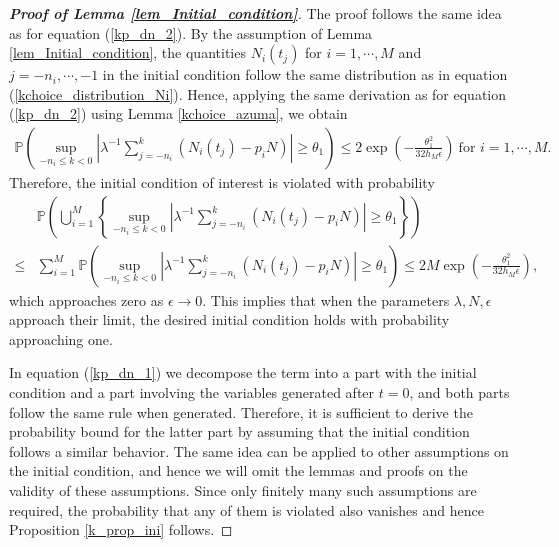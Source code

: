 \documentclass[12pt]{article}
\def\P{\mathbb{P}}
\numberwithin{equation}{section}  %
\begin{document}
\begin{proof}[\textbf{Proof of Lemma \ref{lem_Initial_condition}}]
The proof follows the same idea as for equation (\ref{kp_dn_2}). By the assumption of Lemma \ref{lem_Initial_condition}, the quantities $N_i(t_j)$ for $i=1,\cdots,M$ and $j=-n_i,\cdots,-1$ in the initial condition follow the same distribution as in equation (\ref{kchoice_distribution_Ni}). Hence, applying the same derivation as for equation (\ref{kp_dn_2}) using Lemma \ref{kchoice_azuma}, we obtain
\begin{align*}
\P\left(\sup_{-n_i\leq k<0}\left|\lambda^{-1}\sum_{j=-n_i}^{k} \left(N_i(t_j)-p_iN\right)\right| \geq \theta_1 
\right) \leq 2\exp\left(-\frac{\theta_1^2}{32h_M\epsilon}\right)\ \text{for }i=1,\cdots,M.
\end{align*}
Therefore, the initial condition of interest is violated with probability
\begin{align*}
&\P\left(\bigcup_{i=1}^{M}\left\{\sup_{-n_i\leq k<0}\left|\lambda^{-1}\sum_{j=-n_i}^{k} \left(N_i(t_j)-p_iN\right)\right|\geq\theta_1\right\}\right)\\
    \leq&\sum_{i=1}^M\P\left(\sup_{-n_i\leq k<0}\left|\lambda^{-1}\sum_{j=-n_i}^{k} \left(N_i(t_j)-p_iN\right)\right| \geq \theta_1 
\right) \leq 2M\exp\left(-\frac{\theta_1^2}{32h_M\epsilon}\right),
\end{align*}
which approaches zero as $\epsilon\rightarrow 0$. This implies that when the parameters $\lambda,N,\epsilon$ approach their limit, the desired initial condition holds with probability approaching one.

In equation (\ref{kp_dn_1}) we decompose the term into a part with the initial condition and a part involving the variables generated after $t=0$, and both parts follow the same rule when generated. Therefore, it is sufficient to derive the probability bound for the latter part by assuming that the initial condition follows a similar behavior. The same idea can be applied to other assumptions on the initial condition, and hence we will omit the lemmas and proofs on the validity of these assumptions. Since only finitely many such assumptions are required, the probability that any of them is violated also vanishes and hence Proposition \ref{k_prop_ini} follows.
\end{proof}
\end{document}
